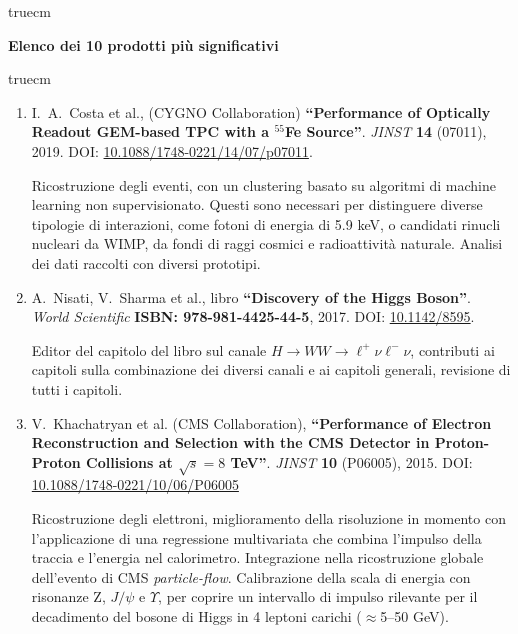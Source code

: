 \documentclass[11pt,twoside,a4paper]{article}
\begin{document}
 truecm
\begin{center}
{\bf{Elenco dei 10 prodotti pi\`u significativi}}
\end{center}
 truecm

\begin{enumerate}

\item I.~A.~Costa et al., (CYGNO Collaboration) \textbf{``Performance
  of Optically Readout GEM-based TPC with a $^{55}$Fe
  Source''}. \textit{JINST} \textbf{14} (07011), 2019. DOI:
  \href{https://iopscience.iop.org/article/10.1088/1748-0221/14/07/P07011}{10.1088/1748-0221/14/07/p07011}.

  Ricostruzione degli eventi, con un clustering basato su algoritmi di
  machine learning non supervisionato.  Questi sono necessari per
  distinguere diverse tipologie di interazioni, come fotoni di energia
  di 5.9 keV, o candidati rinucli nucleari da WIMP, da fondi di raggi
  cosmici e radioattivit\`a naturale. Analisi dei dati raccolti con
  diversi prototipi.

\item A.~Nisati, V.~Sharma et al., libro \textbf{``Discovery of the
  Higgs Boson''}. \textit{World Scientific} \textbf{ISBN:
  978-981-4425-44-5}, 2017. DOI:
  \href{https://www.worldscientific.com/worldscibooks/10.1142/8595}{10.1142/8595}.

  Editor del capitolo del libro sul canale $H\to
  WW\to\ell^+\nu\ell^-\nu$, contributi ai capitoli sulla combinazione
  dei diversi canali e ai capitoli generali, revisione di tutti i
  capitoli.

\item V.~Khachatryan et al. (CMS Collaboration), \textbf{``Performance
  of Electron Reconstruction and Selection with the CMS Detector in
  Proton-Proton Collisions at $\sqrt{s} = 8$ TeV''}. \textit{JINST}
  \textbf{10} (P06005), 2015. DOI:
  \href{https://iopscience.iop.org/article/10.1088/1748-0221/10/06/P06005}{10.1088/1748-0221/10/06/P06005}
  
  Ricostruzione degli elettroni, miglioramento della risoluzione in
  momento con l'applicazione di una regressione multivariata che
  combina l'impulso della traccia e l'energia nel
  calorimetro. Integrazione nella ricostruzione globale dell'evento di
  CMS \textit{particle-flow}. Calibrazione della scala di energia con
  risonanze Z, $J/\psi$ e $\Upsilon$, per coprire un intervallo di
  impulso rilevante per il decadimento del bosone di Higgs in 4
  leptoni carichi ($\approx$5--50 GeV).


\end{enumerate}
\end{document}
